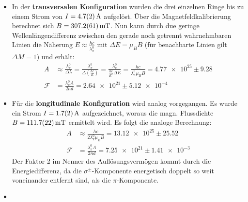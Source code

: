 \begin{itemize}
    \item In der \textbf{transversalen Konfiguration} wurden die drei einzelnen Ringe bis zu einem Strom von $I = \SI{4.7\pm 0.2}{\ampere}$ aufgelöst. Über die Magnetfeldkalibrierung berechnet sich $B = \SI{307.2\pm 6.1}{\milli\tesla}$. Nun kann durch due geringe Wellenlängendifferenz zwischen den gerade noch getrennt wahrnehmbaren Linien die Näherung $E \approx \frac{hc}{\lambda_{\pi}^0}$ mit $\Delta E = \mu_B B$ (für benachbarte Linien gilt $\Delta M = 1$) und erhält:
        \begin{align*}
            A &\approx \frac{\lambda_{\pi}^0}{\Delta \lambda} 
                = \frac{\lambda_{\pi}^0}{\Delta \left(\frac{hc}{E}\right)}
                =  \frac{\lambda_{\pi}^0}{\frac{hc}{E^2}\Delta E}
                = \frac{hc}{\lambda_{\pi}^0\mu_B B} = \num{4.77e25} \pm 9.28\\
            \mathcal{F} &= \frac{\lambda_{\pi}^0 A}{2nd} = \num{2.64e21} \pm \num{5.12e-4}
        \end{align*}
    \item Für die \textbf{longitudinale Konfiguration} wird analog vorgegangen. Es wurde ein Strom $I = \SI{1.7\pm 0.2}{\ampere}$ aufgezeichnet, woraus die magn. Flussdichte $B = \SI{111.7\pm 2.2}{\milli\tesla}$ ermittelt wird. Es folgt die analoge Berechnung:
        \begin{align*}
            A &\approx \frac{hc}{2\lambda_{\pi}^0\mu_B B} = \num{13.12e25} \pm \num{25.52}\\
            \mathcal{F} &= \frac{\lambda_{\pi}^0 A}{2nd} = \num{7.25e21} \pm \num{1.41e-3}
        \end{align*}
    Der Faktor 2 im Nenner des Auflösungsvermögen kommt durch die Energiedifferenz, da die $\sigma^{\pm}$-Komponente energetisch doppelt so weit voneinander entfernt sind, als die $\pi$-Komponente.
    \item 
\end{itemize}
